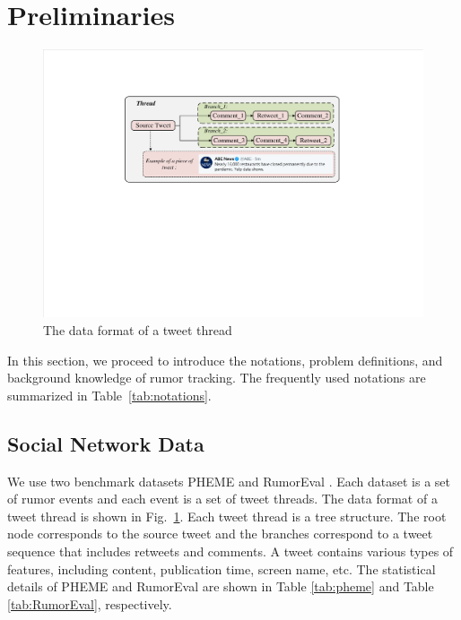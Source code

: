 \documentclass[review]{elsarticle}
\begin{document}
\section{Preliminaries}
\label{sec:perliminary}

\begin{figure}[tbp]
	\hspace{0ex}
	\vspace{0ex}
	\centering
	\includegraphics[width = \textwidth]{data_format}
	\caption{The data format of a tweet thread}
	\label{fig:data_format}
\end{figure}

In this section, we proceed to introduce the notations, problem definitions, and background knowledge of rumor tracking. The frequently used notations are summarized in Table~\ref{tab:notations}.

\subsection{Social Network Data}
\label{sec:social_network_data}
We use two benchmark datasets PHEME \cite{DBLP:conf/coling/KochkinaLZ18} and RumorEval \cite{DBLP:conf/semeval/EnayetE17}. Each dataset is a set of rumor events and each event is a set of tweet threads. The data format of a tweet thread is shown in Fig.~\ref{fig:data_format}. Each tweet thread is a tree structure. The root node corresponds to the source tweet and the branches correspond to a tweet sequence that includes retweets and comments. A tweet contains various types of features, including content, publication time, screen name, etc. The statistical details of PHEME and RumorEval are shown in Table \ref{tab:pheme} and Table \ref{tab:RumorEval}, respectively.
\end{document}

